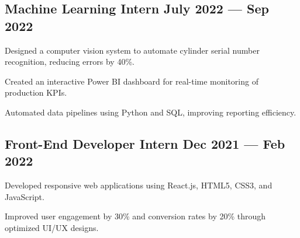 \subsection{{Machine Learning Intern \hfill July 2022 --- Sep 2022}}
\begin{zitemize}
\setlength\itemsep{0.4em}
\item Designed a computer vision system to automate cylinder serial number recognition, reducing errors by 40\%.

\item Created an interactive Power BI dashboard for real-time monitoring of production KPIs.

\item Automated data pipelines using Python and SQL, improving reporting efficiency.
\end{zitemize}

\subsection{{Front-End Developer Intern \hfill Dec 2021 --- Feb 2022}}
\begin{zitemize}
\setlength\itemsep{0.4em}
\item Developed responsive web applications using React.js, HTML5, CSS3, and JavaScript.

\item Improved user engagement by 30\% and conversion rates by 20\% through optimized UI/UX designs.
\end{zitemize}

